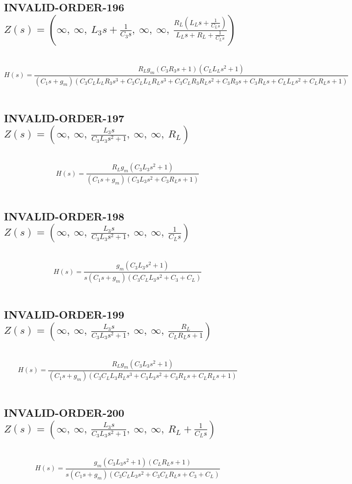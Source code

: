 \documentclass{article}
\begin{document}
\subsection{INVALID-ORDER-196 $Z(s) = \left( \infty, \  \infty, \  L_{3} s + \frac{1}{C_{3} s}, \  \infty, \  \infty, \  \frac{R_{L} \left(L_{L} s + \frac{1}{C_{L} s}\right)}{L_{L} s + R_{L} + \frac{1}{C_{L} s}}\right)$ } \ 
\textbf{\[H(s) = \frac{R_{L} g_{m} \left(C_{3} R_{3} s + 1\right) \left(C_{L} L_{L} s^{2} + 1\right)}{\left(C_{1} s + g_{m}\right) \left(C_{3} C_{L} L_{L} R_{3} s^{3} + C_{3} C_{L} L_{L} R_{L} s^{3} + C_{3} C_{L} R_{3} R_{L} s^{2} + C_{3} R_{3} s + C_{3} R_{L} s + C_{L} L_{L} s^{2} + C_{L} R_{L} s + 1\right)}\] } \ 
\subsection{INVALID-ORDER-197 $Z(s) = \left( \infty, \  \infty, \  \frac{L_{3} s}{C_{3} L_{3} s^{2} + 1}, \  \infty, \  \infty, \  R_{L}\right)$ } \ 
\textbf{\[H(s) = \frac{R_{L} g_{m} \left(C_{3} L_{3} s^{2} + 1\right)}{\left(C_{1} s + g_{m}\right) \left(C_{3} L_{3} s^{2} + C_{3} R_{L} s + 1\right)}\] } \ 
\subsection{INVALID-ORDER-198 $Z(s) = \left( \infty, \  \infty, \  \frac{L_{3} s}{C_{3} L_{3} s^{2} + 1}, \  \infty, \  \infty, \  \frac{1}{C_{L} s}\right)$ } \ 
\textbf{\[H(s) = \frac{g_{m} \left(C_{3} L_{3} s^{2} + 1\right)}{s \left(C_{1} s + g_{m}\right) \left(C_{3} C_{L} L_{3} s^{2} + C_{3} + C_{L}\right)}\] } \ 
\subsection{INVALID-ORDER-199 $Z(s) = \left( \infty, \  \infty, \  \frac{L_{3} s}{C_{3} L_{3} s^{2} + 1}, \  \infty, \  \infty, \  \frac{R_{L}}{C_{L} R_{L} s + 1}\right)$ } \ 
\textbf{\[H(s) = \frac{R_{L} g_{m} \left(C_{3} L_{3} s^{2} + 1\right)}{\left(C_{1} s + g_{m}\right) \left(C_{3} C_{L} L_{3} R_{L} s^{3} + C_{3} L_{3} s^{2} + C_{3} R_{L} s + C_{L} R_{L} s + 1\right)}\] } \ 
\subsection{INVALID-ORDER-200 $Z(s) = \left( \infty, \  \infty, \  \frac{L_{3} s}{C_{3} L_{3} s^{2} + 1}, \  \infty, \  \infty, \  R_{L} + \frac{1}{C_{L} s}\right)$ } \ 
\textbf{\[H(s) = \frac{g_{m} \left(C_{3} L_{3} s^{2} + 1\right) \left(C_{L} R_{L} s + 1\right)}{s \left(C_{1} s + g_{m}\right) \left(C_{3} C_{L} L_{3} s^{2} + C_{3} C_{L} R_{L} s + C_{3} + C_{L}\right)}\] } \ 
\end{document}
